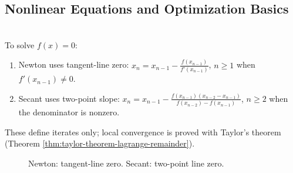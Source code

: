 \subsection{Nonlinear Equations and Optimization Basics}

\begin{method} \label{meth:newton-and-secant-iterations} \\
To solve $f(x)=0$:
\begin{enumerate}[label=(\roman*)]
\setlength{\itemsep}{0pt}
\item
Newton uses tangent-line zero: $x_n=x_{n-1}-\frac{f(x_{n-1})}{f'(x_{n-1})}$, $n\geq1$ when $f'(x_{n-1})\neq0$.
\item
Secant uses two-point slope: $x_n=x_{n-1}-\frac{f(x_{n-1})(x_{n-2}-x_{n-1})}{f(x_{n-2})-f(x_{n-1})}$, $n\geq2$ when the denominator is nonzero.
\end{enumerate}
These define iterates only; local convergence is proved with Taylor's theorem (Theorem \ref{thm:taylor-theorem-lagrange-remainder}).
\end{method}

\begin{figure}[H]
  \centering
  
  \caption{\textcolor{green!45!black}{Newton}: tangent-line zero. \textcolor{orange!85!black}{Secant}: two-point line zero.}
  \label{fig:newton-secant-iterations}
\end{figure}

